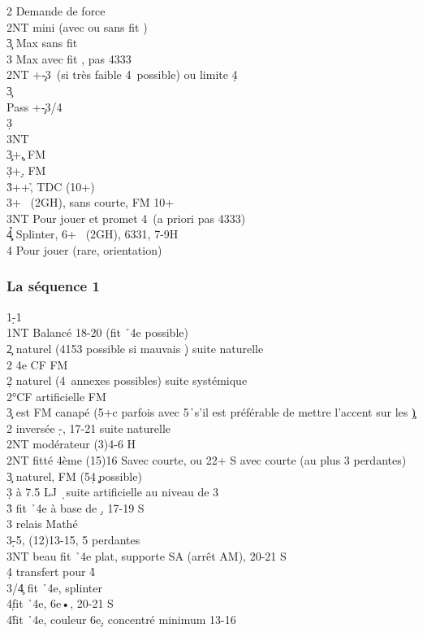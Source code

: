 \documentclass[a4paper]{article}
\begin{document}
\begin{bidtable}
2\s \> Demande de force\+\\
2NT \> mini (avec ou sans fit \s )\\
3\c \> Max sans fit \s \\
3\s \> Max avec fit \s , pas 4333\-\\
2NT +\c -3\s\ (si très faible 4\s\ possible) ou limite 4\d \+\\
3\c\+\\
Pass +\c -3/4\s \\
3\d {}\d \\
3NT\-\-\\
3\c {}+\c , FM\\
3\d {}+\d , FM\\
3\h {}++\h , TDC (10+)\\
3\s {}+ \s\ (2GH), sans courte, FM 10+\\
3NT \> Pour jouer et promet 4\s\ (a priori pas 4333)\\
4\c\d\h \> Splinter, 6+ \s\ (2GH), 6331, 7-9H\\
4\s \> Pour jouer (rare, orientation)\-
\end{bidtable}

\subsubsection{La séquence 1\pdfs}

\begin{bidtable}
1\d-1\s\\
1NT \> Balancé 18-20 (fit \h\ 4e possible)\\
2\c \> naturel (4153 possible si mauvais \d ) suite naturelle\+\\
2\s \> 4e CF FM\-\\
2\d \> naturel (4\s\ annexes possibles) suite systémique\+\\
2\s {}°CF artificielle FM\\
3\c \> est FM canapé (5+\s c parfois avec 5\h\ s'il est préférable de mettre l'accent sur les \c )\-\\
2\s \> inversée \d -\s , 17-21 suite naturelle\+\\
2NT \> modérateur (3)4-6 H\-\\
2NT \> fitté 4ème (15)16 Savec courte, ou 22+ S avec courte (au plus 3 perdantes)\\
3\c \> naturel, FM (5\d 4\c\ possible)\\
3\d {} à 7.5 LJ \d\ suite artificielle au niveau de 3\\
3\h \> fit \h\ 4e à base de \d , 17-19 S\+\\
3\s \> relais Mathé\-\\
3\s {}\d -5\s , (12)13-15, 5 perdantes\\
3NT \> beau fit \h\ 4e plat, supporte SA (arrêt AM), 20-21 S\+\\
4\d \> transfert pour 4\h \-\\
3\s/4\c \> fit \h\ 4e, splinter\\
4\d		fit \> \h\ 4e, 6e•, 20-21 S\\
4\h		fit \> \h\ 4e, couleur 6e\d ,  concentré minimum 13-16
\end{bidtable}
\end{document}
